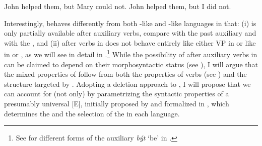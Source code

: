 \documentclass[output=paper,colorlinks,citecolor=brown,]{langsci/langscibook}
\begin{document}
\begin{exe}
\ex \label{english}
\begin{xlist}
\ex\label{1a} John helped them, but Mary could not.
\ex \label{1b}John helped them, but I did not.
\end{xlist}

\ex
\begin{xlist}\label{2}
\end{xlist}

\ex
\begin{xlist}\label{3}
\end{xlist}
\end{exe}

\largerpage
\noindent Interestingly,  behaves differently from both -like and -like languages in that: (i)  is only partially available after auxiliary verbs, compare  with the past auxiliary and  with the , and (ii)  after  verbs in  does not behave entirely like either VP  in  or like  in  or , as we will see in detail in .\footnote{See  for different forms of the auxiliary  \textit{být} `be' in .} While the possibility of  after auxiliary verbs in  can be claimed to depend on their morphosyntactic status (see ), I will argue that the mixed properties of   follow from both the properties of  verbs (see  ) and the structure targeted by . Adopting a deletion approach to , I will propose that we can account for (not only)   by parametrizing the syntactic properties of a presumably universal  [E], initially proposed by \cite{Lobeck1995} and formalized in \cite{Merchant2001}, which determines the  and the selection of the  in each language.
\end{document}

